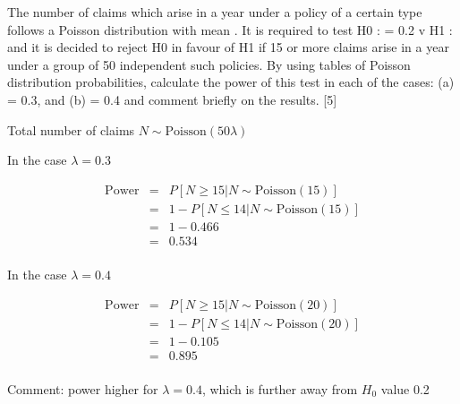 \documentclass[a4paper,12pt]{article}
\begin{document}
The number of claims which arise in a year under a policy of a certain type follows a
Poisson distribution with mean . It is required to test
H0 : = 0.2 v H1 :
and it is decided to reject H0 in favour of H1 if 15 or more claims arise in a year under
a group of 50 independent such policies.
By using tables of Poisson distribution probabilities, calculate the power of this test in
each of the cases:
(a) = 0.3, and
(b) = 0.4
and comment briefly on the results. [5]
\newpage


Total number of claims $N \sim \mbox{Poisson}(50 \lambda)$

In the case $\lambda = 0.3$

\begin{eqnarray*}
\mbox{Power} 
&=& P[N \geq 15| N \sim \mbox{Poisson}(15)]\\
&=& 1 -  P[N \leq 14|  N \sim \mbox{Poisson}(15)]\\
&=& 1 - 0.466\\
&=& 0.534 \\
\end{eqnarray*}

In the case $\lambda = 0.4$

\begin{eqnarray*}
\mbox{Power} 
&=& P[N \geq 15| N \sim \mbox{Poisson}(20)]\\
&=& 1 -  P[N \leq 14|  N \sim \mbox{Poisson}(20)]\\
&=& 1 - 0.105  \\
&=& 0.895 \\
\end{eqnarray*}

Comment: power higher for
$\lambda = 0.4$, which is further away from $H_0$ value 0.2
\end{document}
